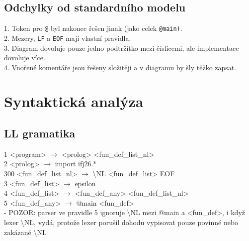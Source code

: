 \documentclass[10pt,a4paper]{article}
\begin{document}
\subsection{Odchylky od standardního modelu}
1. Token pro \texttt{@} byl nakonec řešen jinak (jako celek \texttt{@main)}. \\
2. Mezery, \texttt{LF} a \texttt{EOF} mají vlastní pravidla. \\
3. Diagram dovoluje pouze jedno podtržítko mezi číslicemi, ale implementace dovoluje více. \\
4. Vnořené komentáře jsou řešeny složitěji a v diagramu by šly těžko zapsat.

\section{Syntaktická analýza}
\subsection{LL gramatika}

1 <program> $\to$ <prolog> <fun\_def\_list\_nl> \\
2 <prolog> $\to$ import ifj26.* \\
300 <fun\_def\_list\_nl> $\to$ \textbackslash NL <fun\_def\_list> EOF \\
3 <fun\_def\_list> $\to$ epsilon \\
4 <fun\_def\_list> $\to$ <fun\_def\_any> <fun\_def\_list\_nl>\\
5 <fun\_def\_any> $\to$ @main <fun\_def> \\
- POZOR: parser ve pravidle 5 ignoruje \textbackslash NL 
mezi @main a <fun\_def>, i když lexer \textbackslash NL, 
vydá, protože lexer porušil dohodu vypisovat pouze povinné nebo zakázané \textbackslash NL
\end{document}
